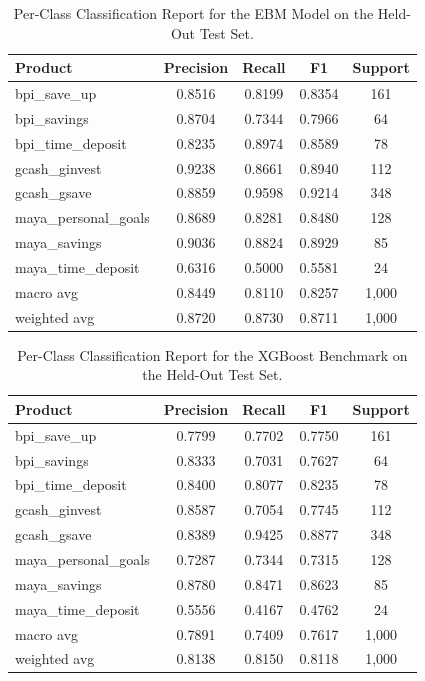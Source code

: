 \documentclass[journal]{./IEEE/IEEEtran}
\begin{document}
\begin{table}[h]
    \centering
    \caption{Per-Class Classification Report for the EBM Model on the Held-Out Test Set.}
    \label{tab:ebm-per-class}
    \footnotesize
    \begin{tabular}{|l|c|c|c|c|}
        \hline
        \textbf{Product} & \textbf{Precision} & \textbf{Recall} & \textbf{F1} & \textbf{Support} \\
        \hline
        bpi\_save\_up & 0.8516 & 0.8199 & 0.8354 & 161 \\
        bpi\_savings & 0.8704 & 0.7344 & 0.7966 & 64 \\
        bpi\_time\_deposit & 0.8235 & 0.8974 & 0.8589 & 78 \\
        gcash\_ginvest & 0.9238 & 0.8661 & 0.8940 & 112 \\
        gcash\_gsave & 0.8859 & 0.9598 & 0.9214 & 348 \\
        maya\_personal\_goals & 0.8689 & 0.8281 & 0.8480 & 128 \\
        maya\_savings & 0.9036 & 0.8824 & 0.8929 & 85 \\
        maya\_time\_deposit & 0.6316 & 0.5000 & 0.5581 & 24 \\
        \hline
        macro avg & 0.8449 & 0.8110 & 0.8257 & 1{,}000 \\
        weighted avg & 0.8720 & 0.8730 & 0.8711 & 1{,}000 \\
        \hline
    \end{tabular}
\end{table}

\begin{table}[h]
    \centering
    \caption{Per-Class Classification Report for the XGBoost Benchmark on the Held-Out Test Set.}
    \label{tab:xgb-per-class}
    \footnotesize
    \begin{tabular}{|l|c|c|c|c|}
        \hline
        \textbf{Product} & \textbf{Precision} & \textbf{Recall} & \textbf{F1} & \textbf{Support} \\
        \hline
        bpi\_save\_up & 0.7799 & 0.7702 & 0.7750 & 161 \\
        bpi\_savings & 0.8333 & 0.7031 & 0.7627 & 64 \\
        bpi\_time\_deposit & 0.8400 & 0.8077 & 0.8235 & 78 \\
        gcash\_ginvest & 0.8587 & 0.7054 & 0.7745 & 112 \\
        gcash\_gsave & 0.8389 & 0.9425 & 0.8877 & 348 \\
        maya\_personal\_goals & 0.7287 & 0.7344 & 0.7315 & 128 \\
        maya\_savings & 0.8780 & 0.8471 & 0.8623 & 85 \\
        maya\_time\_deposit & 0.5556 & 0.4167 & 0.4762 & 24 \\
        \hline
        macro avg & 0.7891 & 0.7409 & 0.7617 & 1{,}000 \\
        weighted avg & 0.8138 & 0.8150 & 0.8118 & 1{,}000 \\
        \hline
    \end{tabular}
\end{table}
\end{document}
